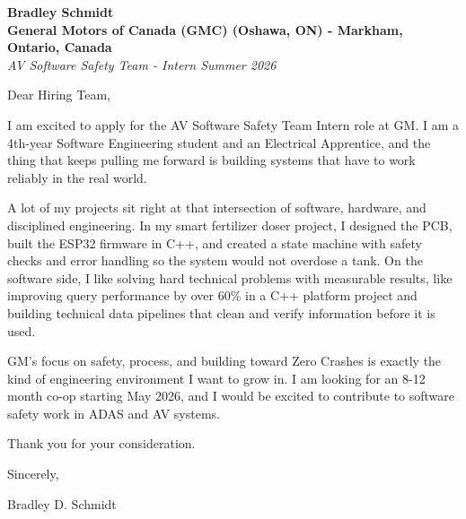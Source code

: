 \documentclass[11pt]{article}
\begin{document}
\textbf{Bradley Schmidt}\\
\vspace{0.5em}
\textbf{General Motors of Canada (GMC) (Oshawa, ON) - Markham, Ontario, Canada}\\
\textit{AV Software Safety Team - Intern Summer 2026}

Dear Hiring Team,

\par

I am excited to apply for the AV Software Safety Team Intern role at GM. I am a 4th-year Software Engineering student and an Electrical Apprentice, and the thing that keeps pulling me forward is building systems that have to work reliably in the real world.

\par

A lot of my projects sit right at that intersection of software, hardware, and disciplined engineering. In my smart fertilizer doser project, I designed the PCB, built the ESP32 firmware in C++, and created a state machine with safety checks and error handling so the system would not overdose a tank. On the software side, I like solving hard technical problems with measurable results, like improving query performance by over 60\% in a C++ platform project and building technical data pipelines that clean and verify information before it is used.

\par

GM's focus on safety, process, and building toward Zero Crashes is exactly the kind of engineering environment I want to grow in. I am looking for an 8-12 month co-op starting May 2026, and I would be excited to contribute to software safety work in ADAS and AV systems.

\par

Thank you for your consideration.

\par

Sincerely,

\par

Bradley D. Schmidt
\end{document}
